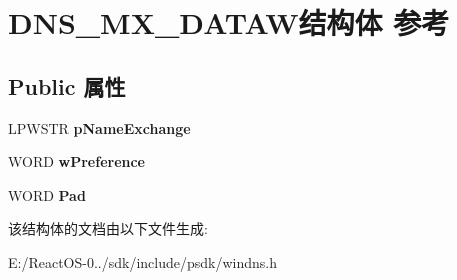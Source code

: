 \hypertarget{struct_d_n_s___m_x___d_a_t_a_w}{}\section{D\+N\+S\+\_\+\+M\+X\+\_\+\+D\+A\+T\+A\+W结构体 参考}
\label{struct_d_n_s___m_x___d_a_t_a_w}
\subsection*{Public 属性}
\begin{DoxyCompactItemize}
\item 
\mbox{\label{struct_d_n_s___m_x___d_a_t_a_w_ad9ab615bee3cc4cb3e5edd5702161bf2}} 
L\+P\+W\+S\+TR {\bfseries p\+Name\+Exchange}
\item 
\mbox{\label{struct_d_n_s___m_x___d_a_t_a_w_a0ad301d463ff6ef7f3b7ad0bfa031b62}} 
W\+O\+RD {\bfseries w\+Preference}
\item 
\mbox{\label{struct_d_n_s___m_x___d_a_t_a_w_a7a47729f828966ed0c0587fdd5c97e56}} 
W\+O\+RD {\bfseries Pad}
\end{DoxyCompactItemize}


该结构体的文档由以下文件生成\+:\begin{DoxyCompactItemize}
\item 
E\+:/\+React\+O\+S-\/0../sdk/include/psdk/windns.\+h\end{DoxyCompactItemize}
